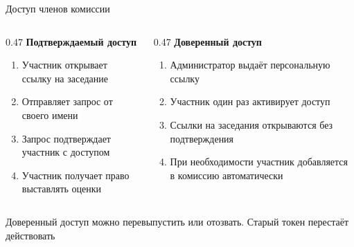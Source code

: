\documentclass[aspectratio=169]{beamer}
\begin{document}
\begin{frame}{Доступ членов комиссии}
  \begin{columns}[T,onlytextwidth]
    \begin{column}{0.47\textwidth}
      \textbf{Подтверждаемый доступ}
      \begin{enumerate}
        \item Участник открывает ссылку на заседание
        \item Отправляет запрос от своего имени
        \item Запрос подтверждает участник с доступом
        \item Участник получает право выставлять оценки
      \end{enumerate}
    \end{column}
    \begin{column}{0.47\textwidth}
      \textbf{Доверенный доступ}
      \begin{enumerate}
        \item Администратор выдаёт персональную ссылку
        \item Участник один раз активирует доступ
        \item Ссылки на заседания открываются без подтверждения
        \item При необходимости участник добавляется в комиссию автоматически
      \end{enumerate}
    \end{column}
  \end{columns}

  \vfill
  \centering
  Доверенный доступ можно перевыпустить или отозвать.
  Старый токен перестаёт действовать
\end{frame}
\end{document}
